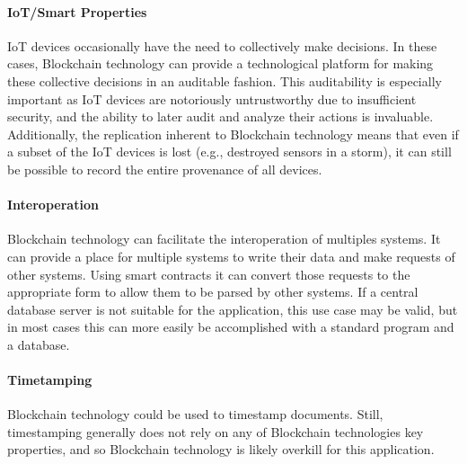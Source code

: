 \paragraph{IoT/Smart Properties}
IoT devices occasionally have the need to collectively make decisions.
In these cases, Blockchain technology can provide a technological platform for making these collective decisions in an auditable fashion.
This auditability is especially important as IoT devices are notoriously untrustworthy due to insufficient security, and the ability to later audit and analyze their actions is invaluable.
Additionally, the replication inherent to Blockchain technology means that even if a subset of the IoT devices is lost (e.g., destroyed sensors in a storm), it can still be possible to record the entire provenance of all devices.

\paragraph{Interoperation}
Blockchain technology can facilitate the interoperation of multiples systems.
It can provide a place for multiple systems to write their data and make requests of other systems.
Using smart contracts it can convert those requests to the appropriate form to allow them to be parsed by other systems.
If a central database server is not suitable for the application, this use case may be valid, but in most cases this can more easily be accomplished with a standard program and a database.


\paragraph{Timetamping}
Blockchain technology could be used to timestamp documents. Still, timestamping generally does not rely on any of Blockchain technologies key properties, and so Blockchain technology is likely overkill for this application.